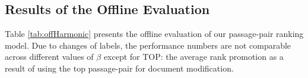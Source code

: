 

\begin{table}[t]
  \tabcolsep=0.2cm
  \caption{\label{tab:offHarmonic} Offline evaluation of the passage-pair ranking
    function with respect to the \random baseline;
    $\beta$ is used for both training and evaluation in the harmonic
    mean of the coherence and rank-promotion labels.
    `*' 
    marks statistically significant difference with 
    \random.}
  
  
\end{table}

\subsection{Results of the Offline Evaluation}
\label{sec:offlineResults}
Table \ref{tab:offHarmonic} presents the offline evaluation of our
passage-pair ranking model.
Due to changes of labels, the performance numbers are not comparable across different values of $\beta$ except for TOP: the average rank promotion as a result of using the top passage-pair for document modification.

